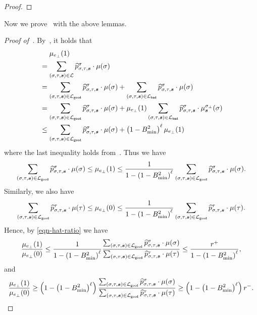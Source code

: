 \documentclass[11pt]{article}
\def\!#1{\mathtt{#1}}
\def\bad{\!{bad}}
\def\good{\!{good}}
\def\symbolwidth{\phantom{{}={}}}
\newcommand{\wh}[1]{\widehat{#1}}
\newcommand{\seqS}{\boldsymbol{s}}
\begin{document}
\begin{proof}
\end{proof}

Now we prove~ with the above lemmas.
\begin{proof}[Proof of~]
    By~, it holds that
    \begin{align*}
        &\symbolwidth \mu_{e_\bot}(1) \\
        &= \sum_{(\sigma, \tau, \seqS) \in \+L} \wh{p}_{\sigma, \tau, \seqS}^{\sigma} \cdot \mu(\sigma) \\
        &= \sum_{(\sigma, \tau, \seqS) \in \+L_{\good}} \wh{p}_{\sigma, \tau, \seqS}^{\sigma} \cdot  \mu(\sigma) + \sum_{(\sigma, \tau, \seqS) \in \+L_{\bad}} \wh{p}_{\sigma, \tau, \seqS}^{\sigma} \cdot  \mu(\sigma) \\
        &= \sum_{(\sigma, \tau, \seqS) \in \+L_{\good}} \wh{p}_{\sigma, \tau, \seqS}^{\sigma} \cdot \mu(\sigma) + \mu_{e_\bot}(1) \sum_{(\sigma, \tau, \seqS) \in \+L_{\bad}} \wh{p}_{\sigma, \tau, \seqS}^{\sigma} \cdot \mu_{\seqS}^{\sigma_{\bot}}(\sigma)\\
        &\le \sum_{(\sigma, \tau, \seqS) \in \+L_{\good}} \wh{p}_{\sigma, \tau, \seqS}^{\sigma} \cdot \mu(\sigma) + \left(1 - B_{\min}^2\right)^{\ell} \mu_{e_\bot}(1)
    \end{align*}
    where the last inequality holds from~. Thus we have
    $$
        \sum_{(\sigma, \tau, \seqS) \in \+L_{\good}} \wh{p}_{\sigma, \tau, \seqS}^{\sigma} \cdot \mu(\sigma) \le \mu_{e_\bot}(1) \le \frac{1}{1 - \left(1 - B_{\min}^2\right)^{\ell}} \sum_{(\sigma, \tau, \seqS) \in \+L_{\good}} \wh{p}_{\sigma, \tau, \seqS}^{\sigma} \cdot \mu(\sigma).
    $$
    Similarly, we also have
    $$
        \sum_{(\sigma, \tau, \seqS) \in \+L_{\good}} \wh{p}_{\sigma, \tau, \seqS}^{\tau} \cdot\mu(\tau)\le \mu_{e_\bot}(0) \le \frac{1}{1 - \left(1 - B_{\min}^2\right)^{\ell}} \sum_{(\sigma, \tau, \seqS) \in \+L_{\good}} \wh{p}_{\sigma, \tau, \seqS}^{\tau} \cdot \mu(\tau).
    $$
    Hence, by \eqref{eqn-hat-ratio} we have
    \begin{align*}
        \frac{\mu_{e_\bot}(1)}{\mu_{e_\bot}(0)} \le \frac{1}{1 - \left(1 - B_{\min}^2\right)^{\ell}} \frac{\sum_{(\sigma, \tau, \seqS) \in \+L_{\good}} \wh{p}_{\sigma, \tau, \seqS}^{\sigma} \cdot \mu(\sigma)}{\sum_{(\sigma, \tau, \seqS) \in \+L_{\good}} \wh{p}_{\sigma, \tau, \seqS}^{\tau} \cdot \mu(\tau)} 
        \le \frac{r^+}{1 - \left(1 - B_{\min}^2\right)^{\ell}},
    \end{align*}
    and
    \begin{align*}
       \frac{\mu_{e_\bot}(1)}{\mu_{e_\bot}(0)} \ge \left(1 - \left(1 - B_{\min}^2\right)^{\ell}\right) \frac{\sum_{(\sigma, \tau, \seqS) \in \+L_{\good}} \wh{p}_{\sigma, \tau, \seqS}^{\sigma} \cdot \mu(\sigma)}{\sum_{(\sigma, \tau, \seqS) \in \+L_{\good}} \wh{p}_{\sigma, \tau, \seqS}^{\tau} \cdot \mu(\tau)} 
        \ge \left(1 - \left(1 - B_{\min}^2\right)^{\ell}\right) r^-.
    \end{align*}
\end{proof}
\end{document}
